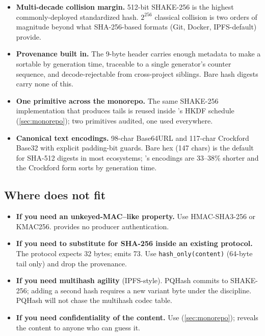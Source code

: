 \begin{itemize}
\item \textbf{Multi-decade collision margin.} 512-bit SHAKE-256 is the highest commonly-deployed standardized hash. $2^{256}$ classical collision is two orders of magnitude beyond what SHA-256-based formats (Git, Docker, IPFS-default) provide.
\item \textbf{Provenance built in.} The 9-byte header carries enough metadata to make a \pqhash{} sortable by generation time, traceable to a single generator's counter sequence, and decode-rejectable from cross-project siblings. Bare hash digests carry none of this.
\item \textbf{One primitive across the monorepo.} The same SHAKE-256 implementation that produces \pqhash{} tails is reused inside \pqcrypt{}'s HKDF schedule (\cref{sec:monorepo}); two primitives audited, one used everywhere.
\item \textbf{Canonical text encodings.} 98-char Base64URL and 117-char Crockford Base32 with explicit padding-bit guards. Bare hex (147 chars) is the default for SHA-512 digests in most ecosystems; \pqhash{}'s encodings are 33--38\% shorter and the Crockford form sorts by generation time.
\end{itemize}

\subsection{Where \pqhash{} does not fit}

\begin{itemize}
\item \textbf{If you need an unkeyed-MAC--like property.} Use HMAC-SHA3-256 or KMAC256. \pqhash{} provides no producer authentication.
\item \textbf{If you need to substitute for SHA-256 inside an existing protocol.} The protocol expects 32 bytes; \pqhash{} emits 73. Use \texttt{hash\_only(content)} (64-byte tail only) and drop the provenance.
\item \textbf{If you need multihash agility} (IPFS-style). PQHash commits to SHAKE-256; adding a second hash requires a new variant byte under the \pqtoolkit{} discipline. PQHash will not chase the multihash codec table.
\item \textbf{If you need confidentiality of the content.} Use \pqcrypt{} (\cref{sec:monorepo}); \pqhash{} reveals the content to anyone who can guess it.
\end{itemize}
